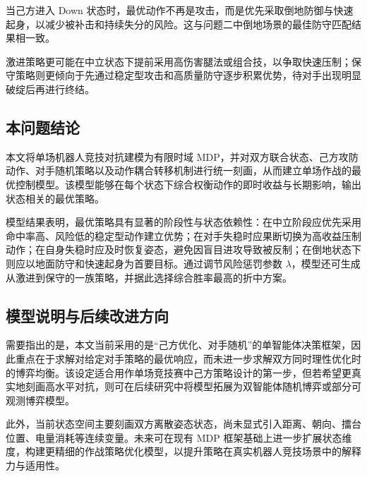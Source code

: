 当己方进入 Down 状态时，最优动作不再是攻击，而是优先采取倒地防御与快速起身，以减少被补击和持续失分的风险。这与问题二中倒地场景的最佳防守匹配结果相一致。

激进策略更可能在中立状态下提前采用高伤害腿法或组合技，以争取快速压制；保守策略则更倾向于先通过稳定型攻击和高质量防守逐步积累优势，待对手出现明显破绽后再进行终结。

\subsection{本问题结论}

本文将单场机器人竞技对抗建模为有限时域 MDP，并对双方联合状态、己方攻防动作、对手随机策略以及动作耦合转移机制进行统一刻画，从而建立单场作战的最优控制模型。该模型能够在每个状态下综合权衡动作的即时收益与长期影响，输出状态相关的最优策略。

模型结果表明，最优策略具有显著的阶段性与状态依赖性：在中立阶段应优先采用命中率高、风险低的稳定型动作建立优势；在对手失稳时应果断切换为高收益压制动作；在自身失稳时应及时恢复姿态，避免因盲目进攻导致被反制；在倒地状态下则应以地面防守和快速起身为首要目标。通过调节风险惩罚参数 \(\lambda\)，模型还可生成从激进到保守的一族策略，并据此选择综合胜率最高的折中方案。


\subsection{模型说明与后续改进方向}

需要指出的是，本文当前采用的是“己方优化、对手随机”的单智能体决策框架，因此重点在于求解对给定对手策略的最优响应，而未进一步求解双方同时理性优化时的博弈均衡。该设定适合用作单场竞技赛中己方策略设计的第一步，但若希望更真实地刻画高水平对抗，则可在后续研究中将模型拓展为双智能体随机博弈或部分可观测博弈模型。

此外，当前状态空间主要刻画双方离散姿态状态，尚未显式引入距离、朝向、擂台位置、电量消耗等连续变量。未来可在现有 MDP 框架基础上进一步扩展状态维度，构建更精细的作战策略优化模型，以提升策略在真实机器人竞技场景中的解释力与适用性。
